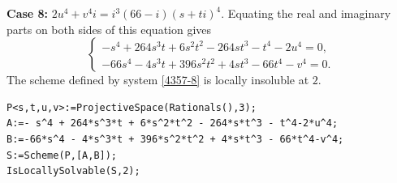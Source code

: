 \documentclass[a4paper,12pt,english,reqno]{amsart}
\begin{document}
{\bf Case 8:} $2u^4+v^4i=i^3(66-i)(s+ti)^4$. Equating the real and imaginary parts on both sides of this equation gives
\begin{equation}\label{4357-8}
\begin{cases}
-s^4 + 264s^3t + 6s^2t^2 - 264st^3 - t^4 - 2u^4=0,\\
-66s^4 - 4s^3t + 396s^2t^2 + 4st^3 - 66t^4 - v^4=0.
\end{cases}
\end{equation}
The scheme defined by system \eqref{4357-8} is locally insoluble at $2$.
\begin{lstlisting}
P<s,t,u,v>:=ProjectiveSpace(Rationals(),3);
A:=- s^4 + 264*s^3*t + 6*s^2*t^2 - 264*s*t^3 - t^4-2*u^4;
B:=-66*s^4 - 4*s^3*t + 396*s^2*t^2 + 4*s*t^3 - 66*t^4-v^4;
S:=Scheme(P,[A,B]);
IsLocallySolvable(S,2);
\end{lstlisting}
\end{document}
